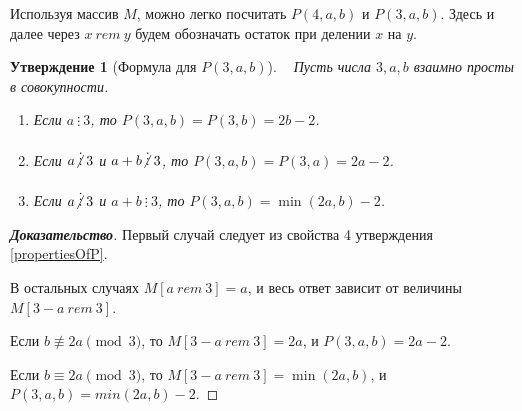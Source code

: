 \documentclass[12pt]{article}
\newtheorem{proposition}[theorem]{Утверждение}
\begin{document}
Используя массив $M$, можно легко посчитать $P(4, a, b)$ и $P(3, a, b)$. Здесь и далее через $x \ rem \ y$ будем обозначать  остаток при делении $x$ на $y$.

\begin{proposition}[Формула для $P(3, a, b)$] { \ }
Пусть числа $3, a, b$ взаимно просты в совокупности.
\begin{enumerate}
\item Если $a \ \vdots \ 3$, то $P(3, a, b) = P(3, b) = 2b - 2$.
\item Если $a \centernot\vdots 3$ и $a + b \centernot\vdots 3$, то $P(3, a, b) = P(3, a) = 2a - 2$.
\item Если $a \centernot\vdots 3$ и $a + b \ \vdots \ 3$, то $P(3, a, b) = \min(2a, b) - 2$.
\end{enumerate}
\end{proposition}
\begin{proof}[\textbf{Доказательство}]
Первый случай следует из свойства 4 утверждения \ref{propertiesOfP}.

В остальных случаях $M[a \ rem \ 3] = a$, и весь ответ зависит от величины $M[3 - a \ rem \ 3]$. 

Если $b \not\equiv 2a \pmod 3$, то $M[3 - a \ rem \ 3] = 2a$, и $P(3, a, b) = 2a - 2$.

Если $b \equiv 2a \pmod 3$, то $M[3 - a \ rem \ 3] = \min(2a, b)$, и $P(3, a, b) = min(2a, b) - 2$.
\end{proof}
\end{document}
